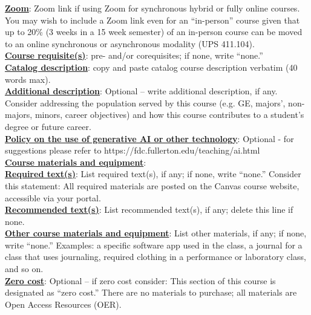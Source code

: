 \documentclass[12pt]{article} %
\begin{document}
\vspace{0.5em}
\noindent \textbf{\underline{Zoom}}: Zoom link if using Zoom for synchronous hybrid or fully online courses. {\color{annotationblue}You may wish to include a Zoom link even for an ``in-person'' course given that up to 20\% (3 weeks in a 15 week semester) of an in-person course can be moved to an online synchronous or asynchronous modality (UPS 411.104).}
\vspace{0.5em} \\
\noindent \textbf{\underline{Course requisite(s)}}: pre- and/or corequisites; if none, write ``none.''
\vspace{0.5em} \\
\noindent \textbf{\underline{Catalog description}}: copy and paste catalog course description verbatim (40 words max).
\vspace{0.5em} \\
\noindent \textbf{\underline{Additional description}}: {\color{annotationblue}Optional -- write additional description, if any. Consider addressing the population served by this course (e.g. GE, majors', non-majors, minors, career objectives) and how this course contributes to a student's degree or future career.}
\vspace{0.5em} \\
\noindent \textbf{\underline{Policy on the use of generative AI or other technology}}: {\color{annotationblue}Optional - for suggestions please refer to https://fdc.fullerton.edu/teaching/ai.html}
\vspace{0.5em} \\
\noindent \textbf{\underline{Course materials and equipment}}:
\vspace{0.5em} \\
\noindent \textbf{\underline{Required text(s)}}: List required text(s), if any; if none, write ``none.'' {\color{suggestionred}Consider this statement: All required materials are posted on the Canvas course website, accessible via your portal.}
\vspace{0.5em} \\
\noindent \textbf{\underline{Recommended text(s)}}: {\color{annotationblue}List recommended text(s), if any; delete this line if none.}
\vspace{0.5em} \\
\noindent \textbf{\underline{Other course materials and equipment}}: List other materials, if any; if none, write ``none.'' {\color{annotationblue}Examples: a specific software app used in the class, a journal for a class that uses journaling, required clothing in a performance or laboratory class, and so on.}
\vspace{0.5em} \\
\noindent \textbf{\underline{Zero cost}}: {\color{annotationblue}Optional -- if zero cost consider:} {\color{suggestionred}This section of this course is designated as ``zero cost.'' There are no materials to purchase; all materials are Open Access Resources (OER).}
\end{document}
